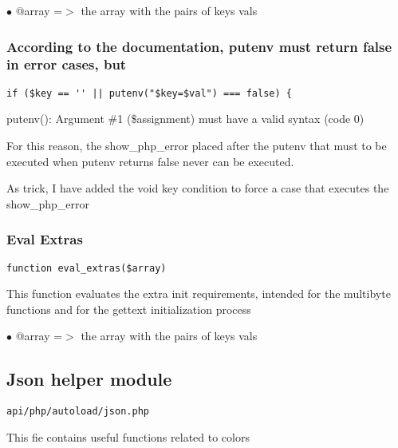 \documentclass[a4paper]{article}
\begin{document}
\begin{compactitem}
\item[\color{myblue}$\bullet$] @array =$>$ the array with the pairs of keys vals
\end{compactitem}

\hypertarget{toc155}{}
\subsubsection{According to the documentation, putenv must return false in error cases, but}

\begin{lstlisting}
if ($key == '' || putenv("$key=$val") === false) {
\end{lstlisting}

putenv(): Argument \#1 (\$assignment) must have a valid syntax (code 0)

For this reason, the show\_php\_error placed after the putenv that must to
be executed when putenv returns false never can be executed.

As trick, I have added the void key condition to force a case that executes
the show\_php\_error

\hypertarget{toc156}{}
\subsubsection{Eval Extras}

\begin{lstlisting}
function eval_extras($array)
\end{lstlisting}

This function evaluates the extra init requirements, intended for the multibyte
functions and for the gettext initialization process

\begin{compactitem}
\item[\color{myblue}$\bullet$] @array =$>$ the array with the pairs of keys vals
\end{compactitem}

\hypertarget{toc157}{}
\subsection{Json helper module}

\begin{lstlisting}
api/php/autoload/json.php
\end{lstlisting}

This fie contains useful functions related to colors
\end{document}
